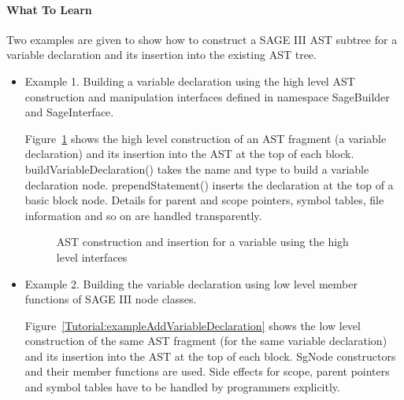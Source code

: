 \paragraph{What To Learn} Two examples are given to show how to construct a SAGE III 
AST subtree for a variable declaration and its insertion into the existing AST tree.
\begin{itemize}
\item Example 1. Building a variable declaration using the high level AST construction and 
manipulation interfaces defined in namespace SageBuilder and SageInterface. 

Figure~\ref{Tutorial:exampleAddVariableDeclaration2} shows the high level
construction of an AST fragment (a variable declaration) and its insertion 
into the AST at the top of each block. buildVariableDeclaration() takes the name and type
to build a variable declaration node. prependStatement() inserts the declaration at the top
of a basic block node. Details for parent and scope pointers, symbol tables, file information 
and so on are handled transparently.

\begin{figure}[!hbp]
{\indent
{\mySmallFontSize
\begin{latexonly}
   
\end{latexonly}

\begin{htmlonly}
   
\end{htmlonly}

}
}
\caption{AST construction and insertion for a variable using the high level interfaces}
\label{Tutorial:exampleAddVariableDeclaration2}
\end{figure}


\item
Example 2. Building the variable declaration using low level member functions of SAGE III node classes.

Figure~\ref{Tutorial:exampleAddVariableDeclaration} shows the low level
construction of the same AST fragment (for the same variable declaration) and its insertion 
into the AST at the top of each block. SgNode constructors and their member functions are used.
Side effects for scope, parent pointers and symbol tables have to be handled by programmers explicitly.


\end{itemize}
